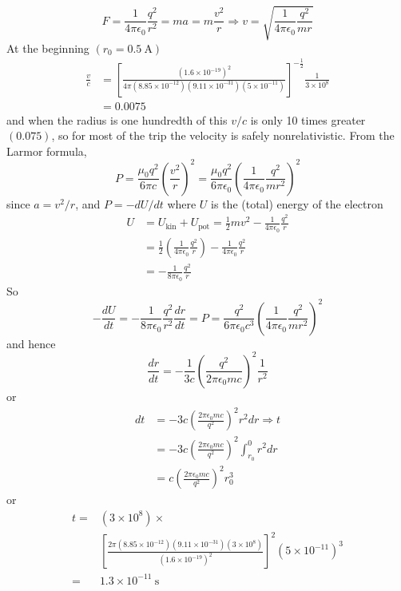 \begin{answer}
$$
F=\frac{1}{4 \pi \epsilon_{0}} \frac{q^{2}}{r^{2}}=m a=m \frac{v^{2}}{r} \Rightarrow v=\sqrt{\frac{1}{4 \pi \epsilon_{0}} \frac{q^{2}}{m r}}
$$
At the beginning $\left(r_{0}=0.5 \mathrm{~A}\right)$
$$
\begin{aligned}
\frac{v}{c} &=\left[\frac{\left(1.6 \times 10^{-19}\right)^{2}}{4 \pi\left(8.85 \times 10^{-12}\right)\left(9.11 \times 10^{-31}\right)\left(5 \times 10^{-11}\right)}\right]^{-\frac{1}{2}} \frac{1}{3 \times 10^{8}} \\
&=0.0075
\end{aligned}
$$
and when the radius is one hundredth of this $v / c$ is only 10 times greater $(0.075)$, so for most of the trip the velocity is safely nonrelativistic. From the Larmor formula,
$$P=\frac{\mu_{0} q^{2}}{6 \pi c}\left(\frac{v^{2}}{r}\right)^{2}=\frac{\mu_{0} q^{2}}{6 \pi \epsilon_{0}}\left(\frac{1}{4 \pi \epsilon_{0}} \frac{q^{2}}{m r^{2}}\right)^{2}$$
since $a=v^{2} / r$, and $P=-d U / d t$ where $U$ is the (total) energy of the electron
$$
\begin{aligned}
	U &=U_{\mathrm{kin}}+U_{\mathrm{pot}}=\frac{1}{2} m v^{2}-\frac{1}{4 \pi \epsilon_{0}} \frac{q^{2}}{r} \\
	&=\frac{1}{2}\left(\frac{1}{4 \pi \epsilon_{0}} \frac{q^{2}}{r}\right)-\frac{1}{4 \pi \epsilon_{0}} \frac{q^{2}}{r} \\
	&=-\frac{1}{8 \pi \epsilon_{0}} \frac{q^{2}}{r}
\end{aligned}$$
So
$$
-\frac{d U}{d t}=-\frac{1}{8 \pi \epsilon_{0}} \frac{q^{2}}{r^{2}} \frac{d r}{d t}=P=\frac{q^{2}}{6 \pi \epsilon_{0} c^{3}}\left(\frac{1}{4 \pi \epsilon_{0}} \frac{q^{2}}{m r^{2}}\right)^{2}
$$
and hence
$$
\frac{d r}{d t}=-\frac{1}{3 c}\left(\frac{q^{2}}{2 \pi \epsilon_{0} m c}\right)^{2} \frac{1}{r^{2}}
$$
or
$$
\begin{aligned}
d t &=-3 c\left(\frac{2 \pi \epsilon_{0} m c}{q^{2}}\right)^{2} r^{2} d r \Rightarrow t \\
&=-3 c\left(\frac{2 \pi \epsilon_{0} m c}{q^{2}}\right)^{2} \int_{r_{0}}^{0} r^{2} d r \\
&=c\left(\frac{2 \pi \epsilon_{0} m c}{q^{2}}\right)^{2} r_{0}^{3}
\end{aligned}
$$
or
$$
\begin{aligned}
t=&\left(3 \times 10^{8}\right) \times \\
&\left[\frac{2 \pi\left(8.85 \times 10^{-12}\right)\left(9.11 \times 10^{-31}\right)\left(3 \times 10^{8}\right)}{\left(1.6 \times 10^{-19}\right)^{2}}\right]^{2}\left(5 \times 10^{-11}\right)^{3} \\
=& 1.3 \times 10^{-11} \mathrm{~s}
\end{aligned}
$$	
\end{answer}
